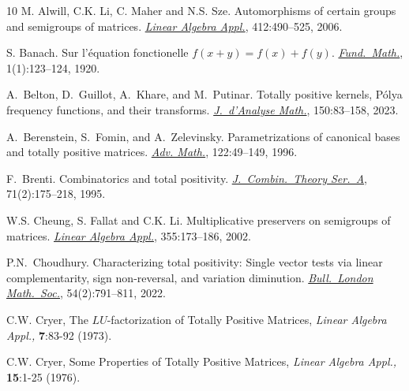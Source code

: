 \documentclass[11pt,reqno]{amsart}
\theoremstyle{plain}
\theoremstyle{definition}
\numberwithin{equation}{section}
\begin{document}
\begin{thebibliography}{10}
	M. Alwill, C.K. Li, C. Maher and N.S. Sze.
	\newblock Automorphisms of certain groups and semigroups of matrices.
	\newblock \href{https://doi.org/10.1016/j.laa.2005.07.015}{\em Linear Algebra Appl.}, 412:490--525, 2006.
	
	
	
	S. Banach.
	\newblock Sur l'\'equation fonctionelle $f( x + y ) = f( x ) + f( y )$.
	\newblock \href{http://dx.doi.org/10.4064/fm-1-1-123-124}%
	{\em Fund.\ Math.}, 1(1):123--124, 1920.
	
	
	
A.~Belton, D.~Guillot, A.~Khare, and M.~Putinar.
\newblock  Totally positive kernels, P\'olya frequency functions,
and their transforms.
\href{https://doi.org/10.1007/s11854-022-0259-7}{\em J.\ d'Analyse Math.}, 150:83--158, 2023.	

A.~Berenstein, S.~Fomin, and A.~Zelevinsky.
\newblock Parametrizations of canonical bases and totally positive matrices.
\newblock \href{http://dx.doi.org/10.1006/aima.1996.0057}{\em Adv.
Math.}, 122:49--149, 1996.

F.~Brenti.
\newblock Combinatorics and total positivity.
\newblock \href{http://dx.doi.org/10.1016/0097-3165(95)90000-4}%
{\em J.\ Combin.\ Theory Ser.~A}, 71(2):175--218, 1995.


W.S. Cheung, S. Fallat and C.K. Li.
\newblock Multiplicative preservers on semigroups of matrices.
\newblock \href{https://doi.org/10.1016/S0024-3795(02)00346-4}{\em Linear Algebra Appl.}, 355:173--186, 2002.

P.N.~Choudhury.
\newblock  Characterizing total positivity: Single vector tests via linear complementarity, sign non-reversal, and variation diminution. \newblock \href{https://doi.org/10.1112/blms.12601}{\em Bull.\ London Math.\ Soc.}, 54(2):791--811, 2022.

C.W. Cryer, 
The $LU$-factorization of Totally Positive Matrices,
{\em Linear Algebra Appl.,} 
{\bf 7}:83-92 (1973).

C.W. Cryer, 
Some Properties of Totally Positive Matrices, 
{\em Linear Algebra Appl.,} 
{\bf 15}:1-25 (1976).



\end{thebibliography}
\end{document}
